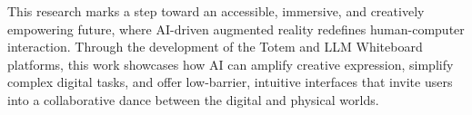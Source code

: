 


This research marks a step toward an accessible, immersive, and creatively empowering future, where AI-driven augmented reality redefines human-computer interaction.
Through the development of the Totem and LLM Whiteboard platforms, this work showcases how AI can amplify creative expression, simplify complex digital tasks, and offer low-barrier, intuitive interfaces that invite users into a collaborative dance between the digital and physical worlds.

